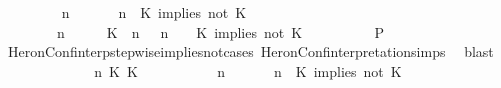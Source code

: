 \begin{isabellebody}
\ \ \ \ \ \ \isamarkupfalse%
\ {\isacartoucheopen}{\isacharparenleft}{\isasymGamma}\ n\ {\isasymturnstile}\ {\isasymPsi}\ {\isasymtriangleright}\ {\isasymPhi}\ {\isacharequal}\ {\isacharparenleft}{\isasymGamma}{\isacharcomma}\ n\ {\isasymturnstile}\ {\isacharparenleft}{\isacharparenleft}K\ implies\ not\ K\ {\isacharhash}\ {\isasymPsi}{\isacharparenright}\ {\isasymtriangleright}\ {\isasymPhi}{\isacharparenright}{\isacartoucheclose}\isanewline
\ \ \ \ \ \ \ {\isacartoucheopen}{\isacharparenleft}{\isasymGamma}\ n\ {\isasymturnstile}\ {\isasymPsi}\ {\isasymtriangleright}\ {\isasymPhi}\ {\isacharequal}\ {\isacharparenleft}{\isacharparenleft}{\isacharparenleft}K\ {\isasymnot}{\isasymUp}\ n{\isacharparenright}\ {\isacharhash}\ {\isasymGamma}{\isacharparenright}{\isacharcomma}\ n\ {\isasymturnstile}\ {\isasymPsi}\ {\isasymtriangleright}\ {\isacharparenleft}{\isacharparenleft}K\ implies\ not\ K\ {\isacharhash}\ {\isasymPhi}{\isacharparenright}{\isacharparenright}{\isacartoucheclose}\isanewline
\ \ \ \ \ \ \isamarkupfalse%
\ {\isacharquery}P\isanewline
\ \ \ \ \ \ \ \ \isamarkupfalse%
\ HeronConf{\isacharunderscore}interp{\isacharunderscore}stepwise{\isacharunderscore}implies{\isacharunderscore}not{\isacharunderscore}cases\ HeronConf{\isacharunderscore}interpretation{\isachardot}simps\ \isamarkupfalse%
\ blast\isanewline
\ \ \ \ \isamarkupfalse%
\isanewline
\ \ \ \ \ \ \isamarkupfalse%
\ {\isasymGamma}\ n\ K\ K\ {\isasymPsi}\ {\isasymPhi}\isanewline
\ \ \ \ \ \ \isamarkupfalse%
\ {\isacartoucheopen}{\isacharparenleft}{\isasymGamma}\ n\ {\isasymturnstile}\ {\isasymPsi}\ {\isasymtriangleright}\ {\isasymPhi}\ {\isacharequal}\ {\isacharparenleft}{\isasymGamma}{\isacharcomma}\ n\ {\isasymturnstile}\ {\isacharparenleft}{\isacharparenleft}K\ implies\ not\ K\ {\isacharhash}\ {\isasymPsi}{\isacharparenright}\ {\isasymtriangleright}\ {\isasymPhi}{\isacharparenright}{\isacartoucheclose}\isanewline

\end{isabellebody}

